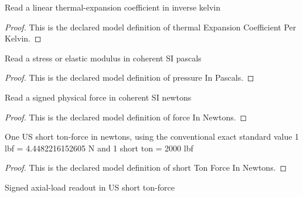 \begin{definition}
  \label{def:physics:phyx-mini-0465:phyxminiproblems-problemphyxmini0465-thermalexpansioncoefficientperkelvin}
  Read a linear thermal-expansion coefficient in inverse kelvin
\end{definition}
\begin{proof}
  This is the declared model definition of thermal Expansion Coefficient Per Kelvin.
\end{proof}
\begin{definition}
  \label{def:physics:phyx-mini-0465:phyxminiproblems-problemphyxmini0465-pressureinpascals}
  Read a stress or elastic modulus in coherent SI pascals
\end{definition}
\begin{proof}
  This is the declared model definition of pressure In Pascals.
\end{proof}
\begin{definition}
  \label{def:physics:phyx-mini-0465:phyxminiproblems-problemphyxmini0465-forceinnewtons}
  Read a signed physical force in coherent SI newtons
\end{definition}
\begin{proof}
  This is the declared model definition of force In Newtons.
\end{proof}
\begin{definition}
  \label{def:physics:phyx-mini-0465:phyxminiproblems-problemphyxmini0465-shorttonforceinnewtons}
  One US short ton-force in newtons, using the conventional exact standard value 1 lbf = 4.4482216152605 N and 1 short ton = 2000 lbf
\end{definition}
\begin{proof}
  This is the declared model definition of short Ton Force In Newtons.
\end{proof}
\begin{definition}
  \label{def:physics:phyx-mini-0465:phyxminiproblems-problemphyxmini0465-forceinshorttonforce}
  Signed axial-load readout in US short ton-force
\end{definition}
